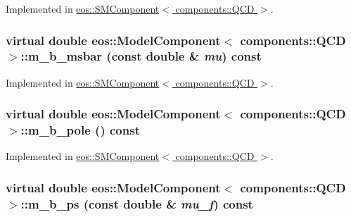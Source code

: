 Implemented in \hyperlink{classeos_1_1SMComponent_3_01components_1_1QCD_01_4_a722ab7fc7efbfd60d0088e4349e29b5b}{eos::SMComponent$<$ components::QCD $>$}.\hypertarget{classeos_1_1ModelComponent_3_01components_1_1QCD_01_4_a1707fd6c3e6a4d8e02437652a3492f73}{
\subsubsection[{m\_\-b\_\-msbar}]{\setlength{\rightskip}{0pt plus 5cm}virtual double eos::ModelComponent$<$ components::QCD $>$::m\_\-b\_\-msbar (const double \& {\em mu}) const}}
\label{classeos_1_1ModelComponent_3_01components_1_1QCD_01_4_a1707fd6c3e6a4d8e02437652a3492f73}


Implemented in \hyperlink{classeos_1_1SMComponent_3_01components_1_1QCD_01_4_a81b71218baa85173813f67b363c73924}{eos::SMComponent$<$ components::QCD $>$}.\hypertarget{classeos_1_1ModelComponent_3_01components_1_1QCD_01_4_a372e8a7dced706f571b33bc18256e324}{
\subsubsection[{m\_\-b\_\-pole}]{\setlength{\rightskip}{0pt plus 5cm}virtual double eos::ModelComponent$<$ components::QCD $>$::m\_\-b\_\-pole () const}}
\label{classeos_1_1ModelComponent_3_01components_1_1QCD_01_4_a372e8a7dced706f571b33bc18256e324}


Implemented in \hyperlink{classeos_1_1SMComponent_3_01components_1_1QCD_01_4_ae2a177d11900636dec6d7d7c9040b9fb}{eos::SMComponent$<$ components::QCD $>$}.\hypertarget{classeos_1_1ModelComponent_3_01components_1_1QCD_01_4_a654bbcce7c337f15ca6f2072da24463d}{
\subsubsection[{m\_\-b\_\-ps}]{\setlength{\rightskip}{0pt plus 5cm}virtual double eos::ModelComponent$<$ components::QCD $>$::m\_\-b\_\-ps (const double \& {\em mu\_\-f}) const}}
\label{classeos_1_1ModelComponent_3_01components_1_1QCD_01_4_a654bbcce7c337f15ca6f2072da24463d}


